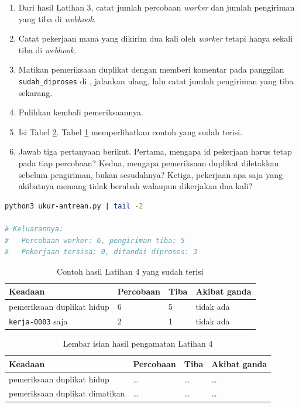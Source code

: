 \begin{enumerate}
  \item Dari hasil Latihan 3, catat jumlah percobaan \textit{worker} dan
        jumlah pengiriman yang tiba di \textit{webhook}.
  \item Catat pekerjaan mana yang dikirim dua kali oleh \textit{worker}
        tetapi hanya sekali tiba di \textit{webhook}.
  \item Matikan pemeriksaan duplikat dengan memberi komentar pada panggilan
        \texttt{sudah\_diproses} di , jalankan ulang, lalu
        catat jumlah pengiriman yang tiba sekarang.
  \item Pulihkan kembali pemeriksaannya.
  \item Isi Tabel \ref{tab:c13-lat4-hasil}. Tabel \ref{tab:c13-lat4-contoh}
        memperlihatkan contoh yang sudah terisi.
  \item Jawab tiga pertanyaan berikut. Pertama, mengapa id pekerjaan harus
        tetap pada tiap percobaan? Kedua, mengapa pemeriksaan duplikat
        diletakkan sebelum pengiriman, bukan sesudahnya? Ketiga, pekerjaan
        apa saja yang akibatnya memang tidak berubah walaupun dikerjakan dua
        kali?
\end{enumerate}

\begin{lstlisting}[language=bash, caption={Membandingkan percobaan dengan pengiriman yang tiba, tersedia di \berkas{sources/chapter13/ukur-antrean.py}}, label={lst:c13-lat4-jalan}]
python3 ukur-antrean.py | tail -2

# Keluarannya:
#   Percobaan worker: 6, pengiriman tiba: 5
#   Pekerjaan tersisa: 0, ditandai diproses: 3
\end{lstlisting}

\begin{table}[!htb]
  \centering
  \caption{Contoh hasil Latihan 4 yang sudah terisi}
  \label{tab:c13-lat4-contoh}
  \begin{tabularx}{\textwidth}{Xlll}
    \hline
    \textbf{Keadaan} & \textbf{Percobaan} & \textbf{Tiba} & \textbf{Akibat ganda} \\
    \hline
    pemeriksaan duplikat hidup & 6 & 5 & tidak ada \\
    \hline
    \texttt{kerja-0003} saja & 2 & 1 & tidak ada \\
    \hline
  \end{tabularx}
\end{table}

\begin{table}[!htb]
  \centering
  \caption{Lembar isian hasil pengamatan Latihan 4}
  \label{tab:c13-lat4-hasil}
  \begin{tabularx}{\textwidth}{Xlll}
    \hline
    \textbf{Keadaan} & \textbf{Percobaan} & \textbf{Tiba} & \textbf{Akibat ganda} \\
    \hline
    pemeriksaan duplikat hidup & \dots & \dots & \dots \\
    \hline
    pemeriksaan duplikat dimatikan & \dots & \dots & \dots \\
    \hline
  \end{tabularx}
\end{table}
